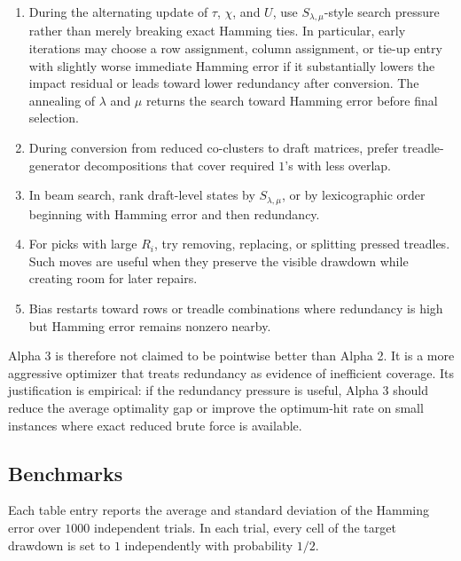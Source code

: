 \documentclass[11pt]{article}
\begin{document}
\begin{enumerate}[label=\textbf{A3.\arabic*.}]
  \item During the alternating update of \(\tau\), \(\chi\), and \(U\), use
  \(S_{\lambda,\mu}\)-style search pressure rather than merely breaking exact
  Hamming ties. In particular, early iterations may choose a row assignment,
  column assignment, or tie-up entry with slightly worse immediate Hamming error
  if it substantially lowers the impact residual or leads toward lower
  redundancy after conversion. The annealing of \(\lambda\) and \(\mu\) returns
  the search toward Hamming error before final selection.

  \item During conversion from reduced co-clusters to draft matrices, prefer
  treadle-generator decompositions that cover required \(1\)'s with less
  overlap.

  \item In beam search, rank draft-level states by \(S_{\lambda,\mu}\), or by
  lexicographic order beginning with Hamming error and then redundancy.

  \item For picks with large \(R_i\), try removing, replacing, or splitting
  pressed treadles. Such moves are useful when they preserve the visible
  drawdown while creating room for later repairs.

  \item Bias restarts toward rows or treadle combinations where redundancy is
  high but Hamming error remains nonzero nearby.
\end{enumerate}

Alpha 3 is therefore not claimed to be pointwise better than Alpha 2. It is a
more aggressive optimizer that treats redundancy as evidence of inefficient
coverage. Its justification is empirical: if the redundancy pressure is useful,
Alpha 3 should reduce the average optimality gap or improve the optimum-hit rate
on small instances where exact reduced brute force is available.




\subsection{Benchmarks}

Each table entry reports the average and standard deviation of the Hamming error over \(1000\)
independent trials. In each trial, every cell of the target drawdown is set to
\(1\) independently with probability \(1/2\).
\end{document}
